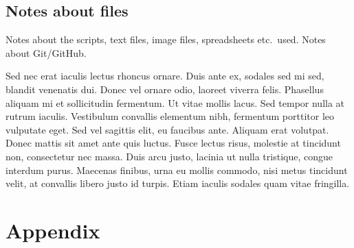 \documentclass[parskip=full]{scrreprt}
\begin{document}
\section{Notes about files}
\label{sec:files}

Notes about the scripts, text files, image files, spreadsheets etc.\ used. Notes about Git/GitHub.

Sed nec erat iaculis lectus rhoncus ornare. Duis ante ex, sodales sed mi sed, blandit venenatis dui. Donec vel ornare odio, laoreet viverra felis. Phasellus aliquam mi et sollicitudin fermentum. Ut vitae mollis lacus. Sed tempor nulla at rutrum iaculis. Vestibulum convallis elementum nibh, fermentum porttitor leo vulputate eget. Sed vel sagittis elit, eu faucibus ante. Aliquam erat volutpat. Donec mattis sit amet ante quis luctus. Fusce lectus risus, molestie at tincidunt non, consectetur nec massa. Duis arcu justo, lacinia ut nulla tristique, congue interdum purus. Maecenas finibus, urna eu mollis commodo, nisi metus tincidunt velit, at convallis libero justo id turpis. Etiam iaculis sodales quam vitae fringilla. 

\chapter*{Appendix}
\label{ch:appendix}



\nocite{*}
\printbibliography
\end{document}
